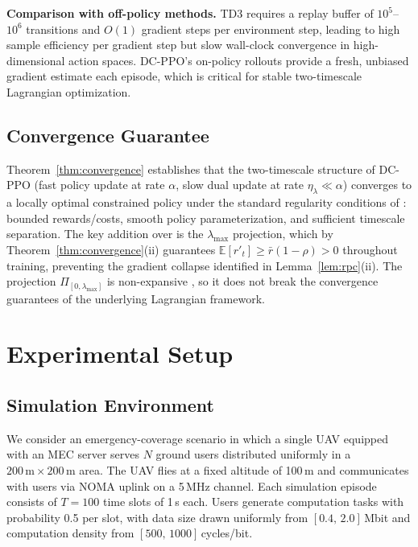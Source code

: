 \documentclass[journal]{IEEEtran}
\begin{document}
\textbf{Comparison with off-policy methods.}
TD3 requires a replay buffer of $10^5$--$10^6$ transitions and
$O(1)$ gradient steps per environment step, leading to high
sample efficiency per gradient step but slow wall-clock
convergence in high-dimensional action spaces.
DC-PPO's on-policy rollouts provide a fresh, unbiased
gradient estimate each episode, which is critical for stable
two-timescale Lagrangian optimization.

\subsection{Convergence Guarantee}

Theorem~\ref{thm:convergence} establishes that the two-timescale
structure of DC-PPO (fast policy update at rate $\alpha$, slow
dual update at rate $\eta_\lambda \ll \alpha$) converges to a
locally optimal constrained policy under the standard regularity
conditions of \cite{tessler2019rcpo}: bounded rewards/costs,
smooth policy parameterization, and sufficient timescale separation.
The key addition over \cite{tessler2019rcpo} is the
$\lambda_{\max}$ projection, which by
Theorem~\ref{thm:convergence}(ii) guarantees
$\mathbb{E}[r'_t] \ge \bar{r}(1-\rho) > 0$ throughout training,
preventing the gradient collapse identified in
Lemma~\ref{lem:rpc}(ii).
The projection $\Pi_{[0,\lambda_{\max}]}$ is non-expansive
\cite{altman1999cmdp}, so it does not break the convergence
guarantees of the underlying Lagrangian framework.

\section{Experimental Setup}\label{sec:setup}

\subsection{Simulation Environment}

We consider an emergency-coverage scenario in which a single UAV
equipped with an MEC server serves $N$ ground users distributed
uniformly in a $200\,\text{m} \times 200\,\text{m}$ area.
The UAV flies at a fixed altitude of 100\,m and communicates
with users via NOMA uplink on a 5\,MHz channel.
Each simulation episode consists of $T = 100$ time slots of 1\,s each.
Users generate computation tasks with probability 0.5 per slot,
with data size drawn uniformly from $[0.4,\, 2.0]$\,Mbit and
computation density from $[500,\, 1000]$\,cycles/bit.
\end{document}
